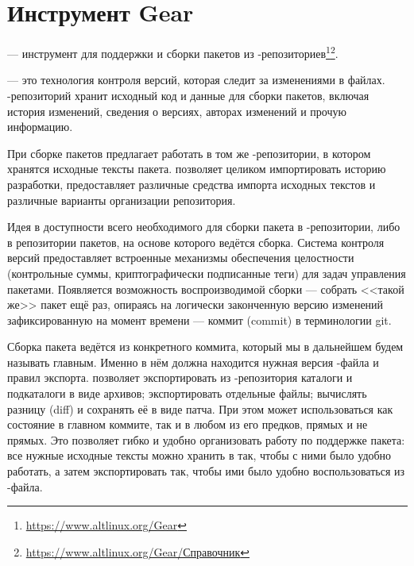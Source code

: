 \chapter{Инструмент Gear}\label{chapter-gear}
 --- инструмент для поддержки и сборки пакетов из -репозиториев\footnote{\href{https://www.altlinux.org/Gear}{https://www.altlinux.org/Gear}}\footnote{\href{https://www.altlinux.org/Gear/\%D0\%A1\%D0\%BF\%D1\%80\%D0\%B0\%D0\%B2\%D0\%BE\%D1\%87\%D0\%BD\%D0\%B8\%D0\%BA}{https://www.altlinux.org/Gear/Справочник}}.


 --- это технология контроля версий, которая следит за изменениями в файлах. -репозиторий хранит исходный код и данные для сборки пакетов, включая история изменений, сведения о версиях, авторах изменений и прочую информацию. 

При сборке пакетов  предлагает работать в том же -репозитории, в котором хранятся исходные тексты пакета.  позволяет целиком импортировать историю разработки, предоставляет различные средства импорта исходных текстов и различные варианты организации репозитория. 

Идея  в доступности всего необходимого для сборки пакета в -репозитории, либо в репозитории пакетов, на основе которого ведётся сборка. Система контроля версий  предоставляет встроенные механизмы обеспечения целостности (контрольные суммы, криптографически подписанные теги) для задач управления пакетами. Появляется возможность воспроизводимой сборки --- собрать <<такой же>> пакет ещё раз, опираясь на логически законченную версию изменений зафиксированную на момент времени --- коммит (commit) в терминологии git.

Сборка пакета ведётся из конкретного коммита, который мы в дальнейшем будем называть главным. Именно в нём должна находится нужная версия -файла и правил экспорта.  позволяет экспортировать из -репозитория каталоги и подкаталоги в виде архивов; экспортировать отдельные файлы; вычислять разницу (diff) и сохранять её в виде патча. При этом может использоваться как состояние в главном коммите, так и в любом из его предков, прямых и не прямых. Это позволяет гибко и удобно организовать работу по поддержке пакета: все нужные исходные тексты можно хранить в  так, чтобы с ними было удобно работать, а затем экспортировать так, чтобы ими было удобно воспользоваться из -файла.

